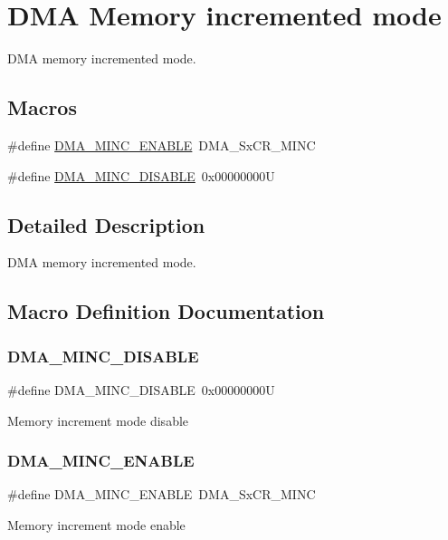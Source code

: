 \hypertarget{group___d_m_a___memory__incremented__mode}{}\section{D\+MA Memory incremented mode}
\label{group___d_m_a___memory__incremented__mode}


D\+MA memory incremented mode.  


\subsection*{Macros}
\begin{DoxyCompactItemize}
\item 
\#define \mbox{\hyperlink{group___d_m_a___memory__incremented__mode_ga43d30885699cc8378562316ff4fed1cd}{D\+M\+A\+\_\+\+M\+I\+N\+C\+\_\+\+E\+N\+A\+B\+LE}}~D\+M\+A\+\_\+\+Sx\+C\+R\+\_\+\+M\+I\+NC
\item 
\#define \mbox{\hyperlink{group___d_m_a___memory__incremented__mode_ga32625330516c188151743473fad97a33}{D\+M\+A\+\_\+\+M\+I\+N\+C\+\_\+\+D\+I\+S\+A\+B\+LE}}~0x00000000U
\end{DoxyCompactItemize}


\subsection{Detailed Description}
D\+MA memory incremented mode. 



\subsection{Macro Definition Documentation}
\mbox{\label{group___d_m_a___memory__incremented__mode_ga32625330516c188151743473fad97a33}} 
\subsubsection{\texorpdfstring{DMA\_MINC\_DISABLE}{DMA\_MINC\_DISABLE}}
{\footnotesize\ttfamily \#define D\+M\+A\+\_\+\+M\+I\+N\+C\+\_\+\+D\+I\+S\+A\+B\+LE~0x00000000U}

Memory increment mode disable \mbox{\label{group___d_m_a___memory__incremented__mode_ga43d30885699cc8378562316ff4fed1cd}} 
\subsubsection{\texorpdfstring{DMA\_MINC\_ENABLE}{DMA\_MINC\_ENABLE}}
{\footnotesize\ttfamily \#define D\+M\+A\+\_\+\+M\+I\+N\+C\+\_\+\+E\+N\+A\+B\+LE~D\+M\+A\+\_\+\+Sx\+C\+R\+\_\+\+M\+I\+NC}

Memory increment mode enable 